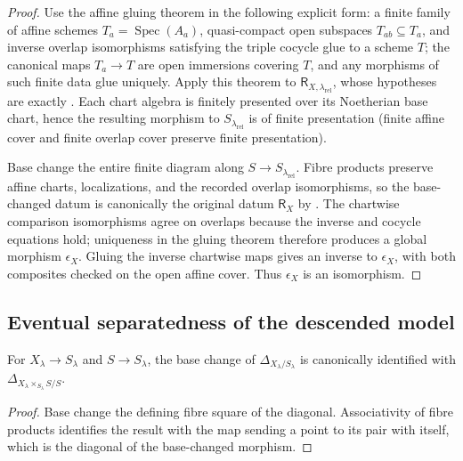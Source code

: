 \begin{proof}
  Use the affine gluing theorem in the following explicit form: a finite
  family of affine schemes $T_a=\operatorname{Spec}(A_a)$, quasi-compact open
  subspaces $T_{ab}\subseteq T_a$, and inverse overlap isomorphisms satisfying
  the triple cocycle glue to a scheme $T$; the canonical maps $T_a\to T$ are
  open immersions covering $T$, and any morphisms of such finite data glue
  uniquely.  Apply this theorem to
  $\mathsf R_{X,\lambda_{\mathrm{rel}}}$, whose hypotheses are exactly
  .  Each chart algebra
  is finitely presented over its Noetherian base chart, hence the resulting
  morphism to $S_{\lambda_{\mathrm{rel}}}$ is of finite presentation (finite
  affine cover and finite overlap cover preserve finite presentation).

  Base change the entire finite diagram along
  $S\to S_{\lambda_{\mathrm{rel}}}$.  Fibre products preserve affine charts,
  localizations, and the recorded overlap isomorphisms, so the base-changed
  datum is canonically the original datum $\mathsf R_X$ by
  .  The chartwise
  comparison isomorphisms agree on overlaps because the inverse and cocycle
  equations hold; uniqueness in the gluing theorem therefore produces a
  global morphism $\epsilon_X$.  Gluing the inverse chartwise maps gives an
  inverse to $\epsilon_X$, with both composites checked on the open affine
  cover.  Thus $\epsilon_X$ is an isomorphism.
\end{proof}

\subsection{Eventual separatedness of the descended model}

\begin{lemma}
  \label{lemma:nagata-diagonal-base-change}

  For $X_\lambda\to S_\lambda$ and $S\to S_\lambda$, the base change of
  $\Delta_{X_\lambda/S_\lambda}$ is canonically identified with
  $\Delta_{X_\lambda\times_{S_\lambda}S/S}$.
\end{lemma}

\begin{proof}
  Base change the defining fibre square of the diagonal.  Associativity of
  fibre products identifies the result with the map sending a point to its
  pair with itself, which is the diagonal of the base-changed morphism.
\end{proof}


